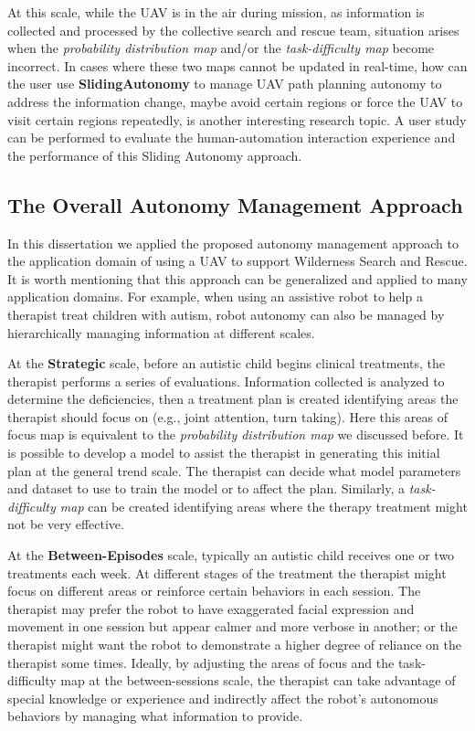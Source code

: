 At this scale, while the UAV is in the air during mission, as information is collected and processed by the collective search and rescue team, situation arises when the \textit{probability distribution map} and/or the \textit{task-difficulty map} become incorrect. In cases where these two maps cannot be updated in real-time, how can the user use \textbf{SlidingAutonomy} to manage UAV path planning autonomy to address the information change, maybe avoid certain regions or force the UAV to visit certain regions repeatedly, is another interesting research topic. A user study can be performed to evaluate the human-automation interaction experience and the performance of this Sliding Autonomy approach.


\subsection{The Overall Autonomy Management Approach}

In this dissertation we applied the proposed autonomy management approach to the application domain of using a UAV to support Wilderness Search and Rescue. It is worth mentioning that this approach can be generalized and applied to many application domains. For example, when using an assistive robot to help a therapist treat children with autism, robot autonomy can also be managed by hierarchically managing information at different scales. 

At the \textbf{Strategic} scale, before an autistic child begins clinical treatments, the therapist performs a series of evaluations. Information collected is analyzed to determine the deficiencies, then a treatment plan is created identifying areas the therapist should focus on (e.g., joint attention, turn taking). Here this areas of focus map is equivalent to the \textit{probability distribution map} we discussed before. It is possible to develop a model to assist the therapist in generating this initial plan at the general trend scale. The therapist can decide what model parameters and dataset to use to train the model or to affect the plan. Similarly, a \textit{task-difficulty map} can be created identifying areas where the therapy treatment might not be very effective.

At the \textbf{Between-Episodes} scale, typically an autistic child receives one or two treatments each week. At different stages of the treatment the therapist might focus on different areas or reinforce certain behaviors in each session. The therapist may prefer the robot to have exaggerated facial expression and movement in one session but appear calmer and more verbose in another; or the therapist might want the robot to demonstrate a higher degree of reliance on the therapist some times. Ideally, by adjusting the areas of focus and the task-difficulty map at the between-sessions scale, the therapist can take advantage of special knowledge or experience and indirectly affect the robot's autonomous behaviors by managing what information to provide.

